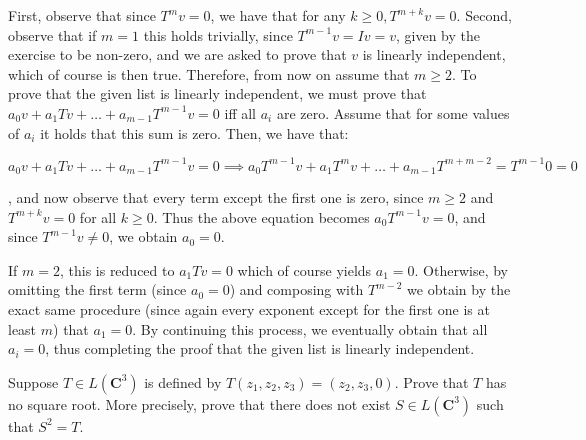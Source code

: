  \begin{solution}
 
     First, observe that since $T^m v =0$, we have that for any $k \geq 0, T^{m+k}v = 0$. Second, observe that if $m = 1$ this holds trivially, since $T^{m-1}v = Iv = v$, given by the exercise to be non-zero, and we are asked to prove that $v$ is linearly independent, which of course is then true. Therefore, from now on assume that $m \geq 2$. To prove that the given list is linearly independent, we must prove that $a_0v + a_1Tv + \ldots + a_{m-1}T^{m-1}v = 0$ iff all $a_i$ are zero. Assume that for some values of $a_i$ it holds that this sum is zero. Then, we have that:

     $$a_0v + a_1Tv + \ldots + a_{m-1}T^{m-1}v = 0 \implies a_0T^{m-1}v + a_1T^{m}v + \ldots + a_{m-1}T^{m + m -2} = T^{m-1}0 = 0$$

     , and now observe that every term except the first one is zero, since $m \geq 2$ and $T^{m+k}v = 0$ for all $k \geq 0$. Thus the above equation becomes $a_0T^{m-1}v = 0$, and since $T^{m-1}v \neq 0$, we obtain $a_0 = 0$.

     If $m = 2$, this is reduced to $a_1Tv = 0$ which of course yields $a_1 = 0$. Otherwise, by omitting the first term (since $a_0 = 0$) and composing with $T^{m-2}$ we obtain by the exact same procedure (since again every exponent except for the first one is at least $m$) that $a_1 = 0$. By continuing this process, we eventually obtain that all $a_i = 0$, thus completing the proof that the given list is linearly independent.
 \end{solution}

 \begin{exercise}{6}
     Suppose $T \in L(\mathbf{C}^3)$ is defined by $T(z_1, z_2, z_3) = (z_2, z_3, 0)$. Prove that $T$ has no square root. More precisely, prove that there does not exist $S \in L(\mathbf{C}^3)$ such that $S^2 = T$.
 \end{exercise}

